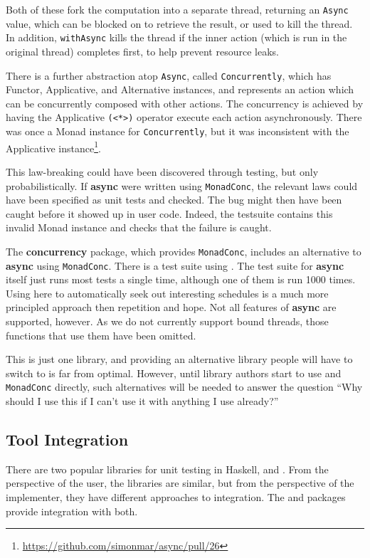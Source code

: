 Both of these fork the computation into a separate thread, returning
an \verb|Async| value, which can be blocked on to retrieve the result,
or used to kill the thread.  In addition, \verb|withAsync| kills the
thread if the inner action (which is run in the original thread)
completes first, to help prevent resource leaks.

There is a further abstraction atop \verb|Async|, called
\verb|Concurrently|, which has Functor, Applicative, and Alternative
instances, and represents an action which can be concurrently composed
with other actions.  The concurrency is achieved by having the
Applicative \verb|(<*>)| operator execute each action asynchronously.
There was once a Monad instance for \verb|Concurrently|, but it was
inconsistent with the Applicative
instance\footnote{\url{https://github.com/simonmar/async/pull/26}}.

This law-breaking could have been discovered through testing, but only
probabilistically.  If \textbf{async} were written using
\verb|MonadConc|, the relevant laws could have been specified as unit
tests and checked.  The bug might then have been caught before it
showed up in user code.  Indeed, the \dejafu{} testsuite contains this
invalid Monad instance and checks that the failure is caught.

The \textbf{concurrency} package, which provides \verb|MonadConc|,
includes an alternative to \textbf{async} using \verb|MonadConc|.
There is a test suite using \dejafu{}.  The test suite for
\textbf{async} itself just runs most tests a single time, although one
of them is run 1000 times.  Using \dejafu{} here to automatically seek
out interesting schedules is a much more principled approach then
repetition and hope.  Not all features of \textbf{async} are
supported, however.  As we do not currently support bound threads,
those functions that use them have been omitted.

This is just one library, and providing an alternative library people
will have to switch to is far from optimal.  However, until library
authors start to use \dejafu{} and \verb|MonadConc| directly, such
alternatives will be needed to answer the question ``Why should I use
this if I can't use it with anything I use already?''

\subsection{Tool Integration}

There are two popular libraries for unit testing in Haskell,
 and .  From the perspective of the
user, the libraries are similar, but from the perspective of the
implementer, they have different approaches to integration.  The
 and  packages provide
integration with both.

